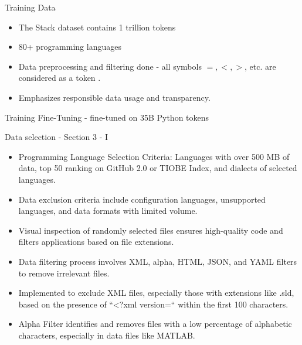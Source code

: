 \begin{frame}{Training Data}
  \begin{itemize}
    \item The Stack dataset contains 1 trillion tokens
    \item 80+ programming languages
       \item Data preprocessing and filtering done - all symbols $=, <, >$, etc. are considered as a token .
    \item Emphasizes responsible data usage and transparency.
  \end{itemize}
\end{frame}
\begin{frame}{Training}
\Huge \centering Fine-Tuning -  fine-tuned on 35B Python tokens
\end{frame}

\begin{frame}{Data selection - Section 3 - I}
\begin{itemize}
\item Programming Language Selection Criteria: Languages with over 500 MB of data, top 50 ranking on GitHub 2.0 or TIOBE Index, and dialects of selected languages.
\item Data exclusion criteria include configuration languages, unsupported languages, and data formats with limited volume.
\item Visual inspection of randomly selected files ensures high-quality code and filters applications based on file extensions.
\item Data filtering process involves XML, alpha, HTML, JSON, and YAML filters to remove irrelevant files.
\item Implemented to exclude XML files, especially those with extensions like .sld, based on the presence of “<?xml version=“ within the first 100 characters.
\item Alpha Filter identifies and removes files with a low percentage of alphabetic characters, especially in data files like MATLAB.

\end{itemize}
\end{frame}

